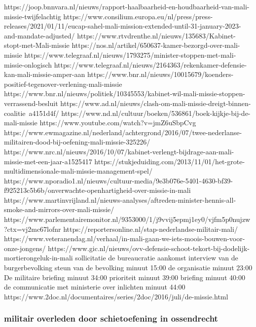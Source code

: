 https://joop.bnnvara.nl/nieuws/rapport-haalbaarheid-en-houdbaarheid-van-mali-missie-twijfelachtig
https://www.consilium.europa.eu/nl/press/press-releases/2021/01/11/eucap-sahel-mali-mission-extended-until-31-january-2023-and-mandate-adjusted/
https://www.rtvdrenthe.nl/nieuws/135683/Kabinet-stopt-met-Mali-missie
https://nos.nl/artikel/650637-kamer-bezorgd-over-mali-missie
https://www.telegraaf.nl/nieuws/1793275/minister-stoppen-met-mali-missie-onlogisch
https://www.telegraaf.nl/nieuws/2164363/rekenkamer-defensie-kan-mali-missie-amper-aan
https://www.bnr.nl/nieuws/10015679/koenders-positief-tegenover-verlening-mali-missie
https://www.bnr.nl/nieuws/politiek/10345553/kabinet-wil-mali-missie-stoppen-verrassend-besluit
https://www.ad.nl/nieuws/clash-om-mali-missie-dreigt-binnen-coalitie~a4151d4f/
https://www.nd.nl/cultuur/boeken/536861/boek-kijkje-bij-de-mali-missie
https://www.youtube.com/watch?v=jmZ6uSbpCvg
https://www.ewmagazine.nl/nederland/achtergrond/2016/07/twee-nederlanse-militairen-dood-bij-oefening-mali-missie-325226/
https://www.nrc.nl/nieuws/2016/10/07/kabinet-verlengt-bijdrage-aan-mali-missie-met-een-jaar-a1525417
https://stukjeduiding.com/2013/11/01/het-grote-multidimensionale-mali-missie-management-spel/
https://www.nporadio1.nl/nieuws/cultuur-media/9e3b076e-5401-4630-bf39-f925213c5b6b/onverwachte-openhartigheid-over-missie-in-mali
https://www.martinvrijland.nl/nieuws-analyses/aftreden-minister-hennis-all-smoke-and-mirrors-over-mali-missie/
https://www.parlementairemonitor.nl/9353000/1/j9vvij5epmj1ey0/vjfm5p0nujzw?ctx=vj2mc67lofnr
https://reportersonline.nl/stap-nederlandse-militair-mali/
https://www.veteranendag.nl/verhaal/in-mali-gaan-we-iets-moois-bouwen-voor-onze-jongens/
https://www.gic.nl/nieuws/ovv-defensie-schoot-tekort-bij-dodelijk-mortierongeluk-in-mali
sollicitatie
de bureaucratie
aankomst
interview van de burgerbevolking
steun van de bevolking minuut 15:00
de organisatie minuut 23:00
De militaire briefing minuut 34:00
prioriteit minuut 39:00
briefing minuut 40:00
de communicatie met ministerie over inlichten minuut 44:00
https://www.2doc.nl/documentaires/series/2doc/2016/juli/de-missie.html

\subsubsection{militair overleden door schietoefening in ossendrecht}


